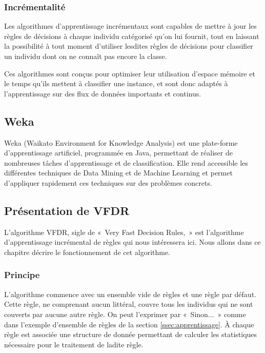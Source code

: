         \subsubsection{Incrémentalité}

            Les algorithmes d’apprentissage incrémentaux sont capables de mettre à jour les règles de décisions à chaque individu catégorisé qu’on lui fournit, tout en laissant la possibilité à tout moment d’utiliser lesdites règles de décisions pour classifier un individu dont on ne connaît pas encore la classe.

            Ces algorithmes sont conçus pour optimiser leur utilisation d'espace mémoire et le temps qu'ils mettent à classifier une instance, et sont donc adaptés à l'apprentissage sur des flux de données importants et continus.

    \subsection{Weka}

        Weka (Waikato Environment for Knowledge Analysis) est une plate-forme d'apprentissage artificiel, programmée en Java, permettant de réaliser de nombreuses tâches d’apprentissage et de classification. Elle rend accessible les différentes techniques de Data Mining et de Machine Learning et  permet d’appliquer rapidement ces techniques sur des problèmes concrets.

    \subsection{Présentation de VFDR}

        L’algorithme VFDR, sigle de «~Very Fast Decision Rules,~» est l’algorithme d’apprentissage incrémental de règles qui nous intéressera ici. Nous allons dans ce chapitre décrire le fonctionnement de cet algorithme.

        \subsubsection{Principe}

            L’algorithme commence avec un ensemble vide de règles et une règle par défaut. Cette règle, ne comprenant aucun littéral, couvre tous les individus qui ne sont couverts par aucune autre règle. On peut l'exprimer par «~Sinon...~» comme dans l'exemple d’ensemble de règles de la section \ref{ssec:apprentissage}. À chaque règle est associée une structure de donnée permettant de calculer les statistiques nécessaire pour le traitement de ladite règle.

